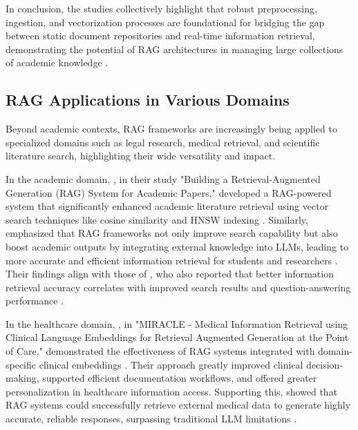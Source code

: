 \begin{refsection}
\bigbreak
\hspace{0.4cm}In conclusion, the studies collectively highlight that robust preprocessing, ingestion, and vectorization processes are foundational for bridging the gap between static document repositories and real-time information retrieval, demonstrating the potential of RAG architectures in managing large collections of academic knowledge \cite{allu2024beyond} \cite{aquino2024extracting}.

\newpage
\clearpage
\subsection{RAG Applications in Various Domains}

\hspace{1cm}Beyond academic contexts, RAG frameworks are increasingly being applied to specialized domains such as legal research, medical retrieval, and scientific literature search, highlighting their wide versatility and impact.

\hspace{0.4cm}In the academic domain, \citeauthor{grigoryan2024building} \citeyear{grigoryan2024building}, in their study "Building a Retrieval-Augmented Generation (RAG) System for Academic Papers," developed a RAG-powered system that significantly enhanced academic literature retrieval using vector search techniques like cosine similarity and HNSW indexing \cite{grigoryan2024building}. Similarly, \citeauthor{song2024travelrag} \citeyear{song2024travelrag} emphasized that RAG frameworks not only improve search capability but also boost academic outputs by integrating external knowledge into LLMs, leading to more accurate and efficient information retrieval for students and researchers \cite{song2024travelrag}. Their findings align with those of \citeauthor{karpukhin2020dense} \citeyear{karpukhin2020dense}, who also reported that better information retrieval accuracy correlates with improved search results and question-answering performance \cite{karpukhin2020dense}.


\hspace{0.4cm}In the healthcare domain, \citeauthor{arzideh2024miracle} \citeyear{arzideh2024miracle}, in "MIRACLE - Medical Information Retrieval using Clinical Language Embeddings for Retrieval Augmented Generation at the Point of Care," demonstrated the effectiveness of RAG systems integrated with domain-specific clinical embeddings \cite{arzideh2024miracle}. Their approach greatly improved clinical decision-making, supported efficient documentation workflows, and offered greater personalization in healthcare information access. Supporting this, \citeauthor{amugongo2024retrieval} \citeyear{amugongo2024retrieval} showed that RAG systems could successfully retrieve external medical data to generate highly accurate, reliable responses, surpassing traditional LLM limitations \cite{amugongo2024retrieval}.


\end{refsection}

